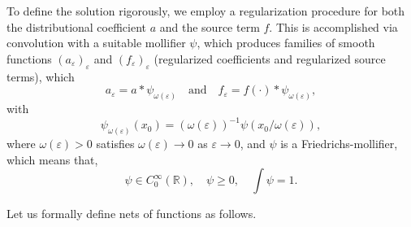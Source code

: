 \documentclass[12pt]{amsart}
\theoremstyle{definition}
\begin{document}
To define the solution rigorously, we employ a regularization procedure for both the distributional coefficient $a$ and the source term $f$. This is accomplished via convolution with a suitable mollifier $\psi$, which produces families of smooth functions $(a_\varepsilon)_\varepsilon$ and $(f_\varepsilon)_\varepsilon$ (regularized coefficients and regularized source terms), which
\begin{equation}
\label{eq1.7}
a_\varepsilon = a * \psi_{\omega(\varepsilon)} \quad \text{and} \quad f_\varepsilon = f(\cdot) * \psi_{\omega(\varepsilon)},
\end{equation}
with
\[
\psi_{\omega(\varepsilon)}(x_0) = (\omega(\varepsilon))^{-1} \psi(x_0 / \omega(\varepsilon)),
\]
where $\omega(\varepsilon) > 0$ satisfies  $\omega(\varepsilon) \to 0$ as $\varepsilon \to 0$, and $\psi$ is a Friedrichs-mollifier, which means that,
\[
\psi \in C_0^\infty(\mathbb{R}), \quad \psi \geq 0, \quad \int \psi = 1.
\]

Let us formally define nets of functions as follows.
\end{document}
